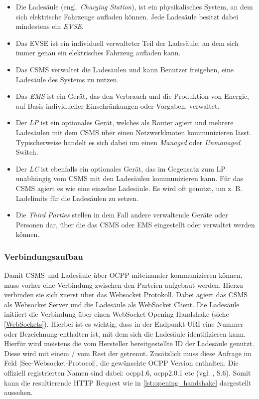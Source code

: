 \begin{itemize}
	\item Die Ladesäule (engl. \textit{Charging Station}), ist ein physikalisches System, an dem sich elektrische Fahrzeuge aufladen können. Jede Ladesäule besitzt dabei mindestens ein \textit{\ac{EVSE}}.
	\item Das \acs{EVSE} ist ein individuell verwalteter Teil der Ladesäule, an dem sich immer genau ein elektrisches Fahrzeug aufladen kann.
	\item Das \acs{CSMS} verwaltet die Ladesäulen und kann Benutzer freigeben, eine Ladesäule des Systems zu nutzen.
	\item Das \textit{\ac{EMS}} ist ein Gerät, das den Verbrauch und die Produktion von Energie, auf Basis individueller Einschränkungen oder Vorgaben, verwaltet.
	\item Der \textit{\ac{LP}} ist ein optionales Gerät, welches als Router agiert und mehrere Ladesäulen mit dem \acs{CSMS} über einen Netzwerkknoten kommunizieren lässt. Typischerweise handelt es sich dabei um einen \textit{Managed} oder \textit{Unmanaged} Switch.
	\item Der \textit{\ac{LC}} ist ebenfalls ein optionales Gerät, das im Gegensatz zum \acs{LP} unabhängig vom \acs{CSMS} mit den Ladesäulen kommunizieren kann. Für das \acs{CSMS} agiert es wie eine einzelne Ladesäule. Es wird oft genutzt, um z. B. Ladelimits für die Ladesäulen zu setzen.
	\item Die \textit{Third Parties} stellen in dem Fall andere verwaltende Geräte oder Personen dar, über die das \acs{CSMS} oder \acs{EMS} eingestellt oder verwaltet werden können.
\end{itemize}

\subsubsection{Verbindungsaufbau}\label{OCPP_Websockets}
Damit \acs{CSMS} und Ladesäule über \acs{OCPP} miteinander kommunizieren können, muss vorher eine Verbindung zwischen den Parteien aufgebaut werden. Hierzu verbinden sie sich zuerst über das Websocket Protokoll. Dabei agiert das \acs{CSMS} als Websocket Server und die Ladesäule als WebSocket Client. Die Ladesäule initiiert die Verbindung über einen WebSocket Opening Handshake (siehe \autoref{WebSockets}). Hierbei ist es wichtig, dass in der Endpunkt \ac{URI} eine Nummer oder Bezeichnung enthalten ist, mit dem sich die Ladesäule identifizieren kann. Hierfür wird meistens die vom Hersteller bereitgestellte \ac{ID} der Ladesäule genutzt. Diese wird mit einem \glqq{}/\grqq{} vom Rest der  getrennt. Zusätzlich muss diese Anfrage im Feld \spverb|Sec-Websocket-Protocol|, die gewünschte OCPP Version enthalten. Die offiziell registrierten Namen sind dabei: ocpp1.6, ocpp2.0.1 etc (vgl. \cite{OCPP-2.0.1-part4-ocpp-j-specification}, S.6). Somit kann die resultierende \acs{HTTP} Request wie in \autoref{lst:opening_handshake} dargestellt aussehen.\\

